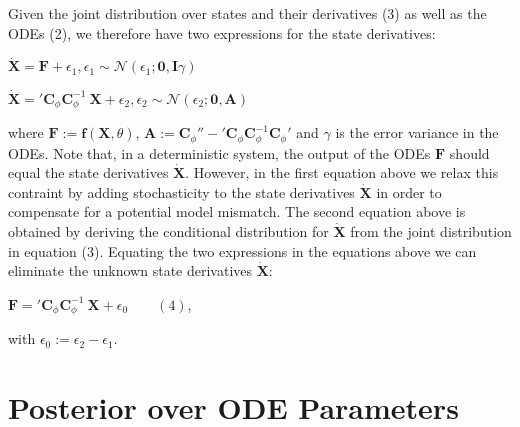 \begin{par}
Given the joint distribution over states and their derivatives (3) as well as the ODEs (2), we therefore have two expressions for the state derivatives:
\end{par} \vspace{1em}
\begin{par}
$\dot{\mathbf{X}} = \mathbf{F} + \epsilon_1, \epsilon_1 \sim \mathcal{N}\left(\epsilon_1;\mathbf{0}, \mathbf{I}\gamma \right)$
\end{par} \vspace{1em}
\begin{par}
$\dot{\mathbf{X}} = {'\mathbf{C}_{\phi}} \mathbf{C}_{\phi}^{-1} ~\mathbf{X} + \epsilon_2, \epsilon_2 \sim \mathcal{N}\left(\epsilon_2;\mathbf{0}, \mathbf{A} \right)$
\end{par} \vspace{1em}
\begin{par}
where $\mathbf{F} := \mathbf{f}(\mathbf{X},\theta)$, $\mathbf{A} := \mathbf{C}_{\phi}'' -  {'\mathbf{C}_{\phi}} \mathbf{C}_{\phi}^{-1} \mathbf{C}_{\phi}'$ and $\gamma$ is the error variance in the ODEs. Note that, in a deterministic system, the output of the ODEs $\mathbf{F}$ should equal the state derivatives $\dot{\mathbf{X}}$. However, in the first equation above we relax this contraint by adding stochasticity to the state derivatives $\dot{\mathbf{X}}$ in order to compensate for a potential model mismatch. The second equation above is obtained by deriving the conditional distribution for $\dot{\mathbf{X}}$ from the joint distribution in equation (3). Equating the two expressions in the equations above we can eliminate the unknown state derivatives $\dot{\mathbf{X}}$:
\end{par} \vspace{1em}
\begin{par}
$\mathbf{F} = {'\mathbf{C}_{\phi}} \mathbf{C}_{\phi}^{-1} ~\mathbf{X} + \epsilon_0 \qquad (4)$,
\end{par} \vspace{1em}
\begin{par}
with $\epsilon_0 := \epsilon_2 - \epsilon_1$.
\end{par} \vspace{1em}

\section{Posterior over ODE Parameters}

